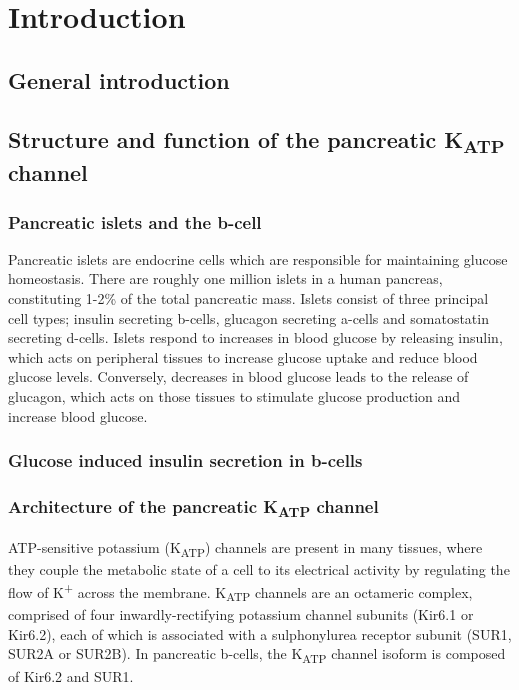 \chapter{\label{ch:1-intro}Introduction} 

\graphicspath{{figures/ch1/}}

\minitoc

\section{General introduction}

\section{Structure and function of the pancreatic K\textsubscript{ATP} channel}

\subsection{Pancreatic islets and the \textgreek{b}-cell}

Pancreatic islets are endocrine cells which are responsible for maintaining glucose homeostasis.
There are roughly one million islets in a human pancreas, constituting 1-2\% of the total pancreatic mass.
Islets consist of three principal cell types; insulin secreting \textgreek{b}-cells, glucagon secreting \textgreek{a}-cells and somatostatin secreting \textgreek{d}-cells.
Islets respond to increases in blood glucose by releasing insulin, which acts on peripheral tissues to increase glucose uptake and reduce blood glucose levels.
Conversely, decreases in blood glucose leads to the release of glucagon, which acts on those tissues to stimulate glucose production and increase blood glucose.

\subsection{Glucose induced insulin secretion in \textgreek{b}-cells}

\subsection{Architecture of the pancreatic K\textsubscript{ATP} channel}

ATP-sensitive potassium (K\textsubscript{ATP}) channels are present in many tissues, where they couple the metabolic state of a cell to its electrical activity by regulating the flow of K\textsuperscript{+} across the membrane.
K\textsubscript{ATP} channels are an octameric complex, comprised of four inwardly-rectifying potassium channel subunits (Kir6.1 or Kir6.2), each of which is associated with a sulphonylurea receptor subunit (SUR1, SUR2A or SUR2B).
In pancreatic \textgreek{b}-cells, the K\textsubscript{ATP} channel isoform is composed of Kir6.2 and SUR1.

